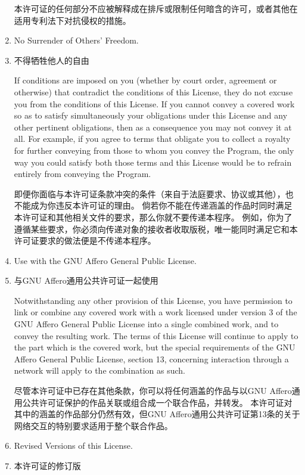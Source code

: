 \documentclass[11pt]{article}
\begin{document}
\begin{enumerate}
        本许可证的任何部分不应被解释成在排斥或限制任何暗含的许可，或者其他在适用专利法下对抗侵权的措施。

  \item No Surrender of Others' Freedom.
  \item 不得牺牲他人的自由

        If conditions are imposed on you (whether by court order, agreement or
        otherwise) that contradict the conditions of this License, they do not
        excuse you from the conditions of this License.  If you cannot convey a
        covered work so as to satisfy simultaneously your obligations under this
        License and any other pertinent obligations, then as a consequence you may
        not convey it at all.  For example, if you agree to terms that obligate you
        to collect a royalty for further conveying from those to whom you convey
        the Program, the only way you could satisfy both those terms and this
        License would be to refrain entirely from conveying the Program.

        即便你面临与本许可证条款冲突的条件（来自于法庭要求、协议或其他），也不能成为你违反本许可证的理由。
        倘若你不能在传递涵盖的作品时同时满足本许可证和其他相关文件的要求，那么你就不要传递本程序。
        例如，你为了遵循某些要求，你必须向传递对象的接收者收取版税，唯一能同时满足它和本许可证要求的做法便是不传递本程序。

  \item Use with the GNU Affero General Public License.
  \item 与GNU Affero通用公共许可证一起使用

        Notwithstanding any other provision of this License, you have
        permission to link or combine any covered work with a work licensed
        under version 3 of the GNU Affero General Public License into a single
        combined work, and to convey the resulting work.  The terms of this
        License will continue to apply to the part which is the covered work,
        but the special requirements of the GNU Affero General Public License,
        section 13, concerning interaction through a network will apply to the
        combination as such.

        尽管本许可证中已存在其他条款，你可以将任何涵盖的作品与以GNU Affero通用公共许可证保护的作品关联或组合成一个联合作品，并转发。
        本许可证对其中的涵盖的作品部分仍然有效，但GNU Affero通用公共许可证第13条的关于网络交互的特别要求适用于整个联合作品。

  \item Revised Versions of this License.
  \item 本许可证的修订版


\end{enumerate}
\end{document}
